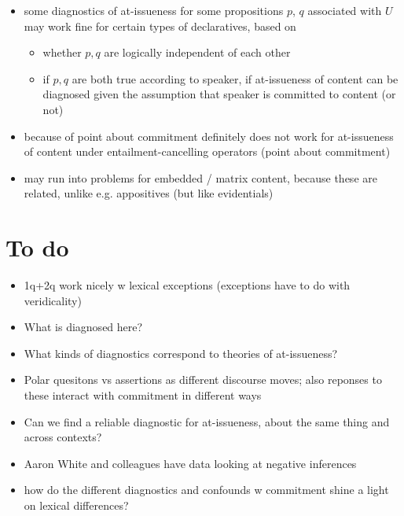 \documentclass[11pt]{article}
\begin{document}
		\begin{itemize}
			\item some diagnostics of at-issueness for some propositions $p$, $q$ associated with $U$  may work fine for certain types of declaratives, based on
			\begin{itemize}
				\item whether $p, q$ are logically independent of each other
				\item if $p, q$ are both true according to speaker, if at-issueness of content can be diagnosed given the assumption that speaker is committed to content (or not)
			\end{itemize}

			\item because of point about commitment definitely does not work for at-issueness of content under entailment-cancelling operators (point about commitment)

			\item may run into problems for embedded / matrix content, because these are related, unlike e.g. appositives (but like evidentials)

		\end{itemize}
	


\section{To do} %
	
	\begin{itemize}
		\item 1q+2q work nicely w lexical exceptions (exceptions have to do with veridicality)
		\item What is diagnosed here?
		\item What kinds of diagnostics correspond to theories of at-issueness?
		\item Polar quesitons vs assertions as different discourse moves; also reponses to these interact with commitment in different ways
		\item Can we find a reliable diagnostic for at-issueness, about the same thing and across contexts?
		\item Aaron White and colleagues have data looking at negative inferences
		\item how do the different diagnostics and confounds w commitment shine a light on lexical differences?
	\end{itemize}


\end{document}
